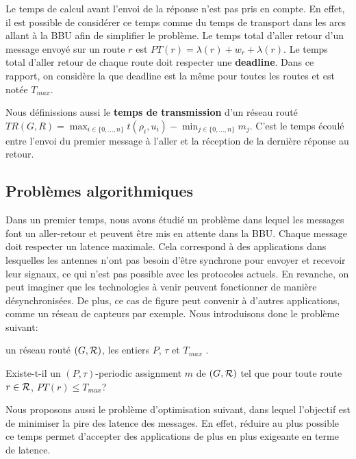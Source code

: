 \documentclass{article}
\begin{document}
Le temps de calcul avant l'envoi de la réponse n'est pas pris en compte. En effet, il est possible de considérer ce temps comme du temps de transport dans les arcs allant à la BBU afin de simplifier le problème.
      Le temps total d'aller retour d'un message envoyé sur un route $r$ est $PT(r)=\lambda(r)+ w_r+\lambda(r)$.      
      Le temps total d'aller retour de chaque route doit respecter une {\bf deadline}. Dans ce rapport, on considère la que deadline est la même pour toutes les routes et est notée $T_{max}$.
      
      Nous définissions aussi le {\bf temps de transmission} d'un réseau routé $TR(G,R) = \displaystyle \max_{i \in \{0,\ldots,n\}} t(\rho_i,u_i) - \displaystyle \min_{j \in \{0,\ldots,n\}} m_j$. C'est le temps écoulé entre l'envoi du premier message à l'aller et la réception de la dernière réponse au retour.
        
\subsection{Problèmes algorithmiques}

	Dans un premier temps, nous avons étudié un problème dans lequel les messages font un aller-retour et peuvent être mis en attente dans la BBU. Chaque message doit respecter un latence maximale. Cela correspond à des applications dans lesquelles les antennes n'ont pas besoin d'être synchrone pour envoyer et recevoir leur signaux, ce qui n'est pas possible avec les protocoles actuels. En revanche, on peut imaginer que les technologies à venir peuvent fonctionner de manière désynchronisées. De plus, ce cas de figure peut convenir à d'autres applications, comme un réseau de capteurs par exemple. Nous introduisons donc le problème suivant:


       un réseau routé $(G,{\cal R})$, les entiers $P$, $\tau$ et $T_{max}$ .
      
       Existe-t-il un $(P,\tau)$-periodic assignment $m$ de $(G,{\cal R})$ tel que pour toute route $r \in {\cal R}$, $PT(r) \leq T_{max}$?
      
      Nous proposons aussi le problème d'optimisation suivant, dans lequel l'objectif est de minimiser la pire des latence des messages. En effet, réduire au plus possible ce temps permet d'accepter des applications de plus en plus exigeante en terme de latence.
      
\end{document}
